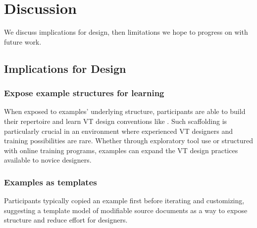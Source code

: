 


%
%
\section{Discussion}
We discuss implications for design, then limitations we hope to progress on with future work. %

\subsection{Implications for Design}
    
    \subsubsection{Expose example structures for learning}
    When exposed to examples' underlying structure, participants are able to build their repertoire and learn VT design conventions like .
    Such scaffolding is particularly crucial in an environment where experienced VT designers and training possibilities are rare. %
    Whether through exploratory tool use or structured with online training programs, examples can expand the VT design practices available to novice designers.
    
    \subsubsection{Examples as templates}
    Participants typically copied an example first before iterating and customizing,
    suggesting a template model of modifiable source documents as a way to expose structure and reduce effort for designers.

